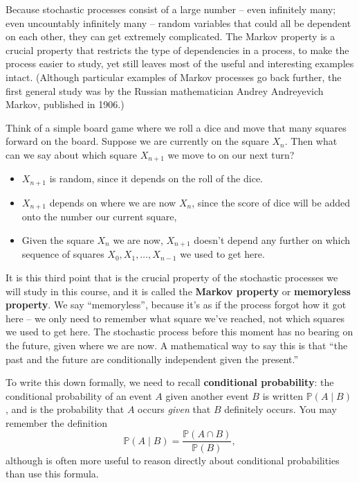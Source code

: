\documentclass[
  a4paper,
]{article}
\providecommand{\tightlist}{%
  \setlength{\itemsep}{0pt}\setlength{\parskip}{0pt}}
\theoremstyle{definition}
\theoremstyle{definition}
\theoremstyle{definition}
\theoremstyle{remark}
\begin{document}
Because stochastic processes consist of a large number -- even infinitely many; even uncountably infinitely many -- random variables that could all be dependent on each other, they can get extremely complicated. The Markov property is a crucial property that restricts the type of dependencies in a process, to make the process easier to study, yet still leaves most of the useful and interesting examples intact. (Although particular examples of Markov processes go back further, the first general study was by the Russian mathematician Andrey Andreyevich Markov, published in 1906.)

Think of a simple board game where we roll a dice and move that many squares forward on the board. Suppose we are currently on the square \(X_n\). Then what can we say about which square \(X_{n+1}\) we move to on our next turn?

\begin{itemize}
\tightlist
\item
  \(X_{n+1}\) is random, since it depends on the roll of the dice.
\item
  \(X_{n+1}\) depends on where we are now \(X_n\), since the score of dice will be added onto the number our current square,
\item
  Given the square \(X_n\) we are now, \(X_{n+1}\) doesn't depend any further on which sequence of squares \(X_0, X_1, \dots, X_{n-1}\) we used to get here.
\end{itemize}

It is this third point that is the crucial property of the stochastic processes we will study in this course, and it is called the \textbf{Markov property} or \textbf{memoryless property}. We say ``memoryless'', because it's as if the process forgot how it got here -- we only need to remember what square we've reached, not which squares we used to get here. The stochastic process before this moment has no bearing on the future, given where we are now. A mathematical way to say this is that ``the past and the future are conditionally independent given the present.''

To write this down formally, we need to recall \textbf{conditional probability}: the conditional probability of an event \(A\) given another event \(B\) is written \(\mathbb P(A \mid B)\), and is the probability that \(A\) occurs \emph{given} that \(B\) definitely occurs. You may remember the definition
\[ \mathbb P(A \mid B) = \frac{\mathbb P(A \cap B)}{\mathbb P(B)} , \]
although is often more useful to reason directly about conditional probabilities than use this formula.
\end{document}
